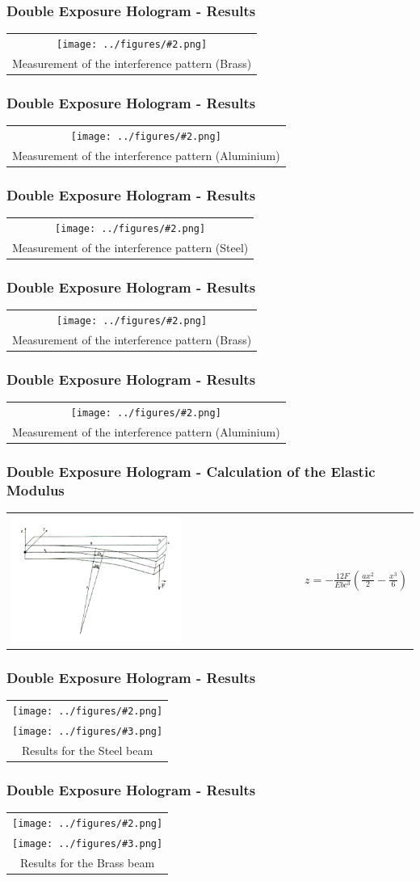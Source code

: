 \documentclass{beamer}
\newcommand{\gra}[3][]{
	\begin{table}
	\centering
	\begin{tabular}[width=\textwidth]{c}
		\texttt{[image: ../figures/\#2.png]}\\
		\small #3
	\end{tabular}
	\end{table}
}
\newcommand{\graTwoOneB}[4][]{
	\begin{table}
		\centering
		\begin{tabular}[width=\textwidth]{c}
			\texttt{[image: ../figures/\#2.png]}\\
			\texttt{[image: ../figures/\#3.png]}\\
			#4
		\end{tabular}
	\end{table}
}
\begin{document}
\begin{frame}
	\frametitle{Double Exposure Hologram - Results}
	\gra[0.8]{staebe3}{Measurement of the interference pattern (Brass)}
\end{frame}
\begin{frame}
	\frametitle{Double Exposure Hologram - Results}
	\gra[0.8]{staebe1}{Measurement of the interference pattern (Aluminium)}
\end{frame}
\begin{frame}
	\frametitle{Double Exposure Hologram - Results}
	\gra[0.8]{Stab2gwid}{Measurement of the interference pattern (Steel)}
\end{frame}
\begin{frame}
	\frametitle{Double Exposure Hologram - Results}
	\gra[0.8]{Stab3gwid}{Measurement of the interference pattern (Brass)}
\end{frame}
\begin{frame}
	\frametitle{Double Exposure Hologram - Results}
	\gra[0.8]{Stab1gwid}{Measurement of the interference pattern (Aluminium)}
\end{frame}
\begin{frame}
	\frametitle{Double Exposure Hologram - Calculation of the Elastic Modulus}
	\begin{table}
		\centering
		\begin{tabular}[width=\textwidth]{m{6cm}m{4cm}}
			\includegraphics[width=0.6\textwidth]{../figures/balken_biegen.png}&
			$z=-\frac{12F}{Ebc^3}\left(\frac{ax^2}{2}-\frac{x^3}{6} \right)$
		\end{tabular}
	\end{table}
\end{frame}
\begin{frame}
	\frametitle{Double Exposure Hologram - Results}
	\graTwoOneB[0.6]{Stab2R1-edit}{Stab1R2-edit}{Results for the Steel beam}
\end{frame}
\begin{frame}
	\frametitle{Double Exposure Hologram - Results}
	\graTwoOneB[0.6]{Stab3R1-edit}{Stab2R2-edit}{Results for the Brass beam}
\end{frame}
\end{document}
